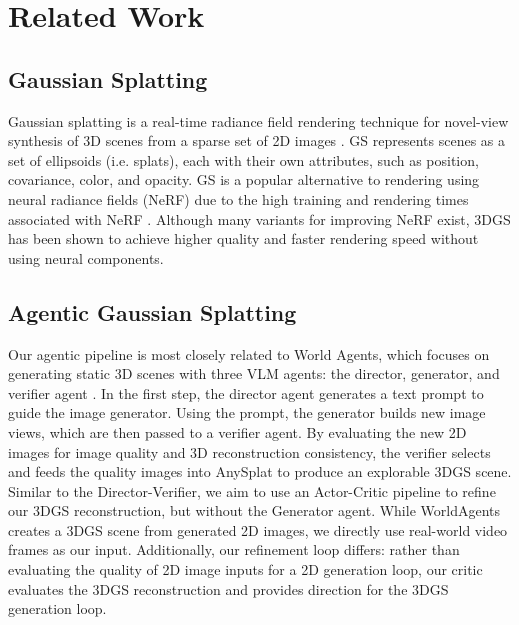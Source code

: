 \section{Related Work}
\label{sec:related_work}

\subsection{Gaussian Splatting}

\noindent Gaussian splatting is a real-time radiance field rendering technique for novel-view synthesis of 3D scenes from a sparse set of 2D images \cite{kerbl20233dgaussiansplattingrealtime}. GS represents scenes as a set of ellipsoids (i.e. splats), each with their own attributes, such as position, covariance, color, and opacity. GS is a popular alternative to rendering using neural radiance fields (NeRF) due to the high training and rendering times associated with NeRF \cite{mildenhall2020nerf}. Although many variants for improving NeRF exist, 3DGS has been shown to achieve higher quality and faster rendering speed without using neural components.

\subsection{Agentic Gaussian Splatting}

\noindent Our agentic pipeline is most closely related to World Agents, which focuses on generating static 3D scenes with three VLM agents: the director, generator, and verifier agent \cite{erkoc2026worldagents}. In the first step, the director agent generates a text prompt to guide the image generator. Using the prompt, the generator builds new image views, which are then passed to a verifier agent. By evaluating the new 2D images for image quality and 3D reconstruction consistency, the verifier selects and feeds the quality images into AnySplat to produce an explorable 3DGS scene. Similar to the Director-Verifier, we aim to use an Actor-Critic pipeline to refine our 3DGS reconstruction, but without the Generator agent. While WorldAgents creates a 3DGS scene from generated 2D images, we directly use real-world video frames as our input. Additionally, our refinement loop differs: rather than evaluating the quality of 2D image inputs for a 2D generation loop, our critic evaluates the 3DGS reconstruction and provides direction for the 3DGS generation loop.